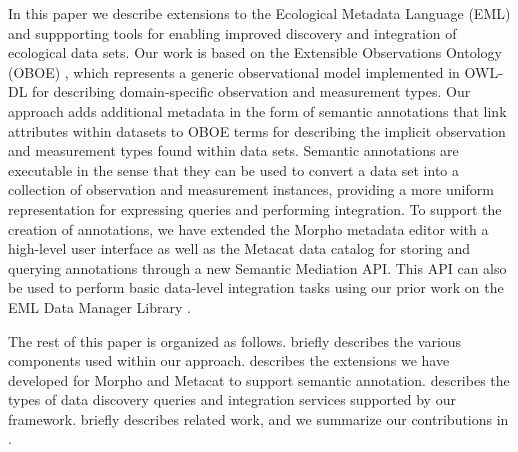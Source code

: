 In this paper we describe extensions to the Ecological Metadata
Language (EML) \cite{Fegraus07} and suppporting tools for enabling
improved discovery and integration of ecological data sets. Our work
is based on the Extensible Observations Ontology (OBOE)
\cite{bowers08,madin07:_ontol_for_descr_and_synth}, which represents a
generic observational model implemented in OWL-DL for describing
domain-specific observation and measurement types. Our approach adds
additional metadata in the form of semantic annotations that link
attributes within datasets to OBOE terms for describing the implicit
observation and measurement types found within data sets. Semantic
annotations are executable in the sense that they can be used to
convert a data set into a collection of observation and measurement
instances, providing a more uniform representation for expressing
queries and performing integration.  To support the creation of
annotations, we have extended the Morpho metadata editor
\cite{metacat02:_manag_heter_ecolog_data_using_morph} with a
high-level user interface as well as the Metacat data catalog
\cite{berkley01:_metac} for storing and querying annotations through a
new Semantic Mediation API. This API can also be used to perform basic
data-level integration tasks using our prior work on the EML Data
Manager Library \cite{leinfelder10:_metad_driven_approac_to_loadin}.

The rest of this paper is organized as follows. 
briefly describes the various components used within our
approach.  describes the extensions we have
developed for Morpho and Metacat to support semantic
annotation.  describes the types of data
discovery queries and integration services supported by our
framework.  briefly describes related work, and we
summarize our contributions in . 






